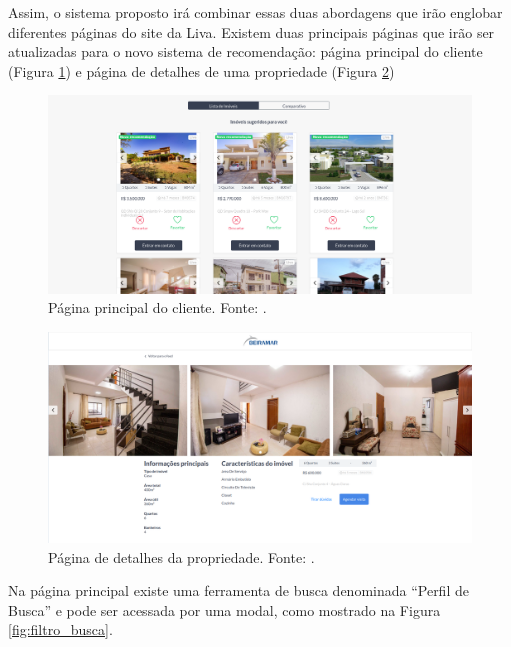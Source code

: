 Assim, o sistema proposto irá combinar essas duas abordagens que irão englobar diferentes páginas do site da Liva. Existem duas principais páginas que irão ser atualizadas para o novo sistema de recomendação: página principal do cliente (Figura \ref{fig:pagina_principal}) e página de detalhes de uma propriedade (Figura \ref{fig:pagina_detalhes})

\begin{figure}[H]
    \centering
    \includegraphics[scale=0.33]{figuras/proposta/pagina_principal.png}
    \caption[Página principal do cliente]{Página principal do cliente. Fonte:  \cite{Liva:2019}.}
    \label{fig:pagina_principal}
\end{figure}

\begin{figure}[H]
    \centering
    \includegraphics[scale=0.23]{figuras/proposta/pagina_detalhes.png}
    \caption[Página de detalhes da propriedade]{Página de detalhes da propriedade. Fonte: \cite{Liva:2019}.}
    \label{fig:pagina_detalhes}
\end{figure}

Na página principal existe uma ferramenta de busca denominada “Perfil de Busca” e pode ser acessada por uma modal, como mostrado na Figura \ref{fig:filtro_busca}.

